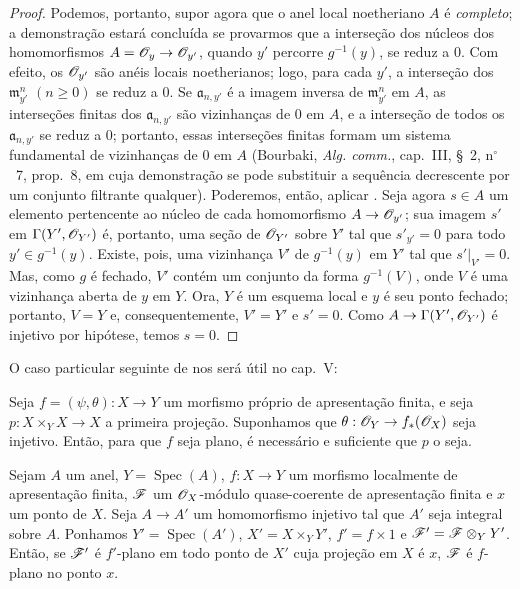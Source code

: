 \begin{proof}
Podemos, portanto, supor
agora que o anel local
noetheriano $A$ é
\emph{completo}; a
demonstração estará concluída
se provarmos que a
interseção dos núcleos dos
homomorfismos
$A=\sh{O}_y\to\sh{O}_{y'}$,
quando $y'$ percorre
$g^{-1}(y)$, se reduz a $0$.
Com efeito, os
$\mathscr{O}_{y'}$ são anéis
locais noetherianos; logo,
para cada $y'$, a interseção
dos $\mathfrak m_{y'}^n$
$(n\geq0)$ se reduz a $0$.
Se $\mathfrak a_{n,y'}$ é a
imagem inversa de
$\mathfrak m_{y'}^n$ em
$A$, as interseções finitas
dos $\mathfrak a_{n,y'}$
são vizinhanças de $0$
em $A$, e a interseção de
todos os $\mathfrak a_{n,y'}$
se reduz a $0$; portanto,
essas interseções finitas
formam um sistema fundamental
de vizinhanças de $0$ em
$A$ (Bourbaki,
\emph{Alg. comm.}, cap.~III,
\S~2, n$^\circ$~7, prop.~8,
em cuja demonstração se pode
substituir a sequência
decrescente por um conjunto
filtrante qualquer). Poderemos,
então, aplicar
.
Seja agora $s\in A$ um
elemento pertencente ao
núcleo de cada homomorfismo
$A\to\sh{O}_{y'}$; sua imagem
$s'$ em
$\Gamma(Y',\mathscr{O}_{Y'})$
é, portanto, uma seção de
$\mathscr{O}_{Y'}$ sobre $Y'$
tal que $s'_{y'}=0$ para
todo $y'\in g^{-1}(y)$.
Existe, pois, uma vizinhança
$V'$ de $g^{-1}(y)$ em $Y'$
tal que $s'|_{V'}=0$.
Mas, como $g$ é fechado,
$V'$ contém um conjunto da
forma $g^{-1}(V)$, onde
$V$ é uma vizinhança aberta
de $y$ em $Y$. Ora, $Y$ é
um esquema local e $y$ é
seu ponto fechado; portanto,
$V=Y$ e, consequentemente,
$V'=Y'$ e $s'=0$. Como
$A\to\Gamma(Y',\sh{O}_{Y'})$
é injetivo por hipótese,
temos $s=0$.
\end{proof}

O caso particular seguinte
de  nos
será útil no cap.~V:

\begin{corollary}[11.5.4]
\label{IV.11.5.4}
Seja $f=(\psi,\theta):X\to Y$
um morfismo próprio de
apresentação finita, e
seja $p:X\times_Y X\to X$
a primeira projeção.
Suponhamos que
$\theta:\sh{O}_Y\to
f_*(\sh{O}_X)$ seja
injetivo. Então, para que
$f$ seja plano, é necessário
e suficiente que $p$ o seja.
\end{corollary}

\begin{proposition}[11.5.5]
\label{IV.11.5.5}
Sejam $A$ um anel,
$Y=\operatorname{Spec}(A)$,
$f:X\to Y$ um morfismo
localmente de apresentação
finita, $\mathscr{F}$ um
$\mathscr{O}_X$-módulo
quase-coerente de apresentação
finita e $x$ um ponto de
$X$. Seja $A\to A'$ um
homomorfismo injetivo tal
que $A'$ seja integral sobre
$A$. Ponhamos
$Y'=\operatorname{Spec}(A')$,
$X'=X\times_Y Y'$,
$f'=f\times1$ e
$\mathscr{F}'=\mathscr{F}\otimes_Y Y'$.
Então, se $\mathscr{F}'$ é
$f'$-plano em todo ponto
de $X'$ cuja projeção em
$X$ é $x$, $\mathscr{F}$ é
$f$-plano no ponto $x$.
\end{proposition}

